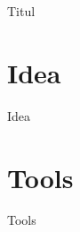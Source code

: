 \documentclass[a4paper,12pt]{book} %
\begin{document}
    {Titul}

    \tableofcontents

    \newpage

    \chapter{Idea}
    {Idea}

    \chapter{Tools}
    {Tools}
\end{document}
